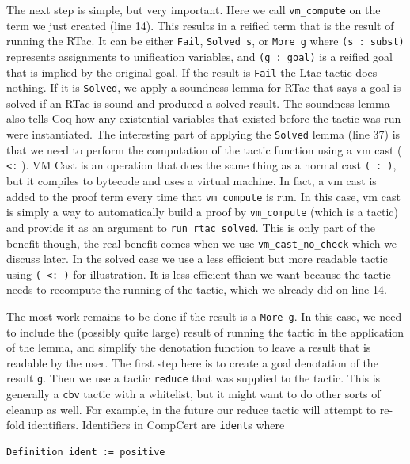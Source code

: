 \documentclass{puthesis}
\begin{document}
The next step is simple, but very important. Here we call
\lstinline|vm_compute| on the term we just created (line 14). This
results in a reified term that is the result of running the RTac. It
can be either \lstinline|Fail|, \lstinline|Solved s|, or
\lstinline|More g| where \lstinline|(s : subst)| represents
assignments to unification variables, and \lstinline|(g : goal)| is a
reified goal that is implied by the original goal. If the result is
\lstinline|Fail| the Ltac tactic does nothing. If it is
\lstinline|Solved|, we apply a soundness lemma for RTac that says a
goal is solved if an RTac is sound and produced a solved result. The
soundness lemma also tells Coq how any existential variables that
existed before the tactic was run were instantiated. The interesting
part of applying the \lstinline|Solved| lemma (line 37) is that we
need to perform the computation of the tactic function using a vm cast
( \lstinline|<:| ). VM Cast is an operation that does the same thing
as a normal cast \lstinline|( : )|, but it compiles to bytecode and
uses a virtual machine. In fact, a vm cast is added to the proof term
every time that \lstinline|vm_compute| is run. In this case, vm cast
is simply a way to automatically build a proof by
\lstinline|vm_compute| (which is a tactic) and provide it as an
argument to \lstinline|run_rtac_solved|. This is only part of the
benefit though, the real benefit comes when we use
\lstinline|vm_cast_no_check| which we discuss later. 
In the solved case we use a less efficient but more readable tactic
using \lstinline|( <: )| for illustration. It is less efficient than
we want because the tactic needs to recompute the running of the
tactic, which we already did on line 14.

The most work remains to be done if the result is a 
\lstinline|More g|.
 In this case, we need to include the (possibly quite large) result
of running the tactic in the application of the lemma, and simplify
the denotation function to leave a result that is readable by the
user.  The first step here is to create a goal denotation of the
result \lstinline|g|. Then we use a tactic \lstinline|reduce| that was
supplied to the tactic. This is generally a \lstinline|cbv| tactic
with a whitelist, but it might want to do other sorts of cleanup as
well. For example, in the future our reduce tactic will attempt to
re-fold identifiers. Identifiers in CompCert are \lstinline|ident|s
where

\begin{lstlisting}
Definition ident := positive
\end{lstlisting}
\end{document}
